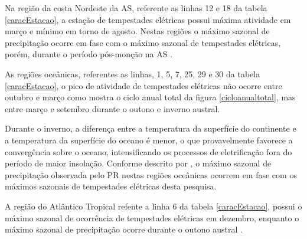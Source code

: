 

Na região da costa Nordeste da AS, referente as linhas 12 e 18 da tabela \ref{caracEstacao}, a estação de tempestades elétricas possui máxima atividade em março e mínimo em torno de agosto. Nestas regiões o máximo sazonal de precipitação ocorre em fase com o máximo sazonal de tempestades elétricas, porém, durante o período pós-monção na AS \cite{grimm2003nino,reboita2010regimes,shi-atlas,bombardi2008variabilidade,cusdodioTese}.

As regiões oceânicas, referentes as linhas, 1, 5, 7, 25, 29 e 30 da tabela \ref{caracEstacao}, o pico de atividade de tempestades elétricas não ocorre entre outubro e março como mostra o ciclo anual total da figura \ref{cicloanualtotal}, mas entre março e setembro durante o outono e inverno austral. 



 Durante o inverno, a diferença entre a temperatura da superfície do continente e a temperatura da superfície do oceano é menor, o que provavelmente favorece a convergência  sobre o oceano, intensificando os processos de eletrificação fora do período de maior insolação. Conforme descrito por , o máximo sazonal de precipitação observada pelo PR nestas regiões oceânicas ocorrem em fase com os máximos sazonais de tempestades elétricas desta pesquisa. 

A região do Atlântico Tropical refente a linha 6 da tabela \ref{caracEstacao}, possui o máximo sazonal de ocorrência de tempestades elétricas em dezembro, enquanto o máximo sazonal de precipitação ocorre durante o outono austral \cite{cusdodioTese}.




